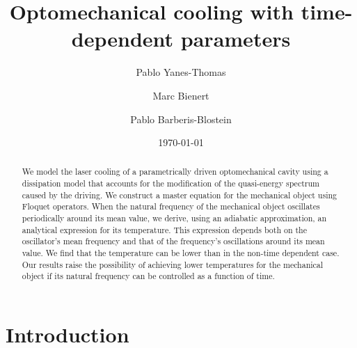\documentclass[reprint, amsmath,amssymb, aps,pra]{revtex4-1}
\begin{document}

\title{Optomechanical cooling with time-dependent parameters}%

\author{Pablo Yanes-Thomas}

\author{Marc Bienert}

\author{Pablo Barberis-Blostein}

%



\date{\today}

\begin{abstract}
  We model the laser cooling of a parametrically driven optomechanical
  cavity using a dissipation model 
  that accounts for the modification of the quasi-energy spectrum
  caused by the driving. We construct a master equation for the
  mechanical object using Floquet operators. When the natural
  frequency of the mechanical object oscillates periodically around its mean value,
  we derive, using an adiabatic approximation, an analytical
  expression for its temperature. This expression depends both on the
  oscillator's mean frequency and that of the frequency's oscillations
  around its mean value. We find that the temperature can be lower
  than in the non-time dependent case. Our results raise the
  possibility of achieving lower temperatures for the mechanical object
  if its natural frequency can be controlled as a function of time.
\end{abstract}

\maketitle


\section{Introduction}
\end{document}
